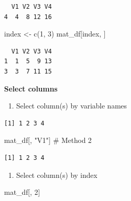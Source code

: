 \documentclass[
  letterpaper,
  DIV=11,
  numbers=noendperiod]{scrreprt}
\newenvironment{Shaded}{\begin{snugshade}}{\end{snugshade}}
\newcommand{\CommentTok}[1]{\textcolor[rgb]{0.37,0.37,0.37}{#1}}
\newcommand{\DecValTok}[1]{\textcolor[rgb]{0.68,0.00,0.00}{#1}}
\newcommand{\FunctionTok}[1]{\textcolor[rgb]{0.28,0.35,0.67}{#1}}
\newcommand{\NormalTok}[1]{\textcolor[rgb]{0.00,0.23,0.31}{#1}}
\newcommand{\OtherTok}[1]{\textcolor[rgb]{0.00,0.23,0.31}{#1}}
\newcommand{\SpecialCharTok}[1]{\textcolor[rgb]{0.37,0.37,0.37}{#1}}
\newcommand{\StringTok}[1]{\textcolor[rgb]{0.13,0.47,0.30}{#1}}
\providecommand{\tightlist}{%
  \setlength{\itemsep}{0pt}\setlength{\parskip}{0pt}}\usepackage{longtable,booktabs,array}
\begin{document}
\begin{verbatim}
  V1 V2 V3 V4
4  4  8 12 16
\end{verbatim}

\begin{Shaded}
\begin{Highlighting}[]
\NormalTok{index }\OtherTok{\textless{}{-}} \FunctionTok{c}\NormalTok{(}\DecValTok{1}\NormalTok{, }\DecValTok{3}\NormalTok{)}
\NormalTok{mat\_df[index, ]}
\end{Highlighting}
\end{Shaded}

\begin{verbatim}
  V1 V2 V3 V4
1  1  5  9 13
3  3  7 11 15
\end{verbatim}

\textbf{Select columns}

\begin{enumerate}
\def\labelenumi{\arabic{enumi}.}
\tightlist
\item
  Select column(s) by variable names
\end{enumerate}

\begin{Shaded}
\end{Shaded}

\begin{verbatim}
[1] 1 2 3 4
\end{verbatim}

\begin{Shaded}
\begin{Highlighting}[]
\NormalTok{mat\_df[, }\StringTok{"V1"}\NormalTok{] }\CommentTok{\# Method 2}
\end{Highlighting}
\end{Shaded}

\begin{verbatim}
[1] 1 2 3 4
\end{verbatim}

\begin{enumerate}
\def\labelenumi{\arabic{enumi}.}
\setcounter{enumi}{1}
\tightlist
\item
  Select column(s) by index
\end{enumerate}

\begin{Shaded}
\begin{Highlighting}[]
\NormalTok{mat\_df[, }\DecValTok{2}\NormalTok{]}
\end{Highlighting}
\end{Shaded}
\end{document}
